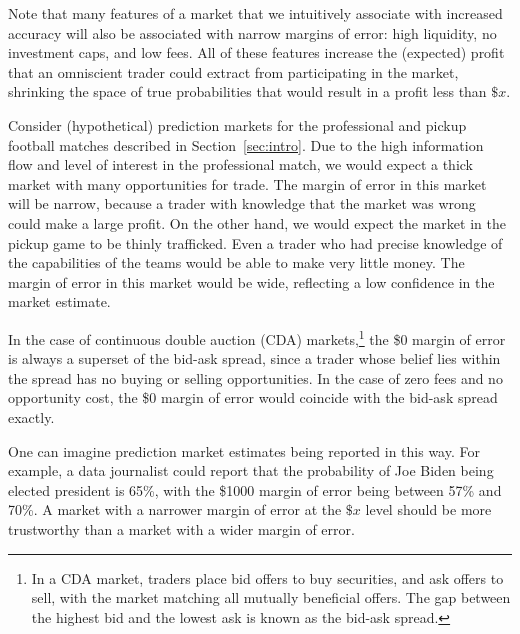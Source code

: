 \documentclass[sigconf,anonymous]{aamas}   %
\begin{document}

Note that many features of a market that we intuitively associate with increased accuracy will also be associated with narrow margins of error: high liquidity, no investment caps, and low fees.
All of these features increase the (expected) profit that an omniscient trader could extract from participating in the market, 
shrinking the space of true probabilities 
that would result in a profit less than $\$x$.

Consider (hypothetical) prediction markets for the professional and pickup football matches described in Section~\ref{sec:intro}. Due to the high information flow and level of interest in the professional match, we would expect a thick market with many opportunities for trade. The margin of error in this market will be narrow, because a trader with knowledge that the market was wrong could make a large profit. On the other hand, we would expect the market in the pickup game to be thinly trafficked. Even a trader who had precise knowledge of the capabilities of the teams would be able to make very little money. The margin of error in this market would be wide, reflecting a low confidence in the market estimate.

In the case of continuous double auction (CDA) markets,\footnote{In a CDA market, traders place bid offers to buy securities, and ask offers to sell, with the market matching all mutually beneficial offers. The gap between the highest bid and the lowest ask is known as the bid-ask spread.} the \$0 margin of error is always a superset of the bid-ask spread, since a trader whose belief lies within the spread has no buying or selling opportunities.
In the case of zero fees and no opportunity cost, the \$0 margin of error would coincide with the bid-ask spread exactly.

One can imagine prediction market estimates being reported in this way. 
For example, a
data journalist
could report that the probability of Joe Biden being elected president is 65\%, with the \$1000 margin of error being between 57\% and 70\%. A market with a narrower margin of error at the $\$x$ level should be more trustworthy than a market with a wider margin of error.
\end{document}
